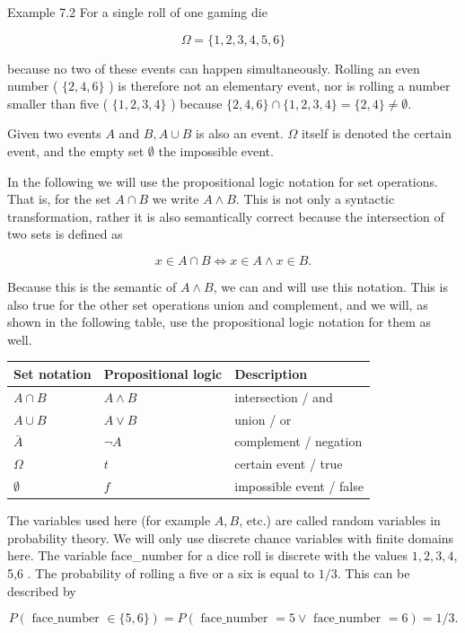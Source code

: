\documentclass[10pt]{article}
\begin{document}
Example 7.2 For a single roll of one gaming die

$$
\Omega=\{1,2,3,4,5,6\}
$$

because no two of these events can happen simultaneously. Rolling an even number ( $\{2,4,6\}$ ) is therefore not an elementary event, nor is rolling a number smaller than five ( $\{1,2,3,4\}$ ) because $\{2,4,6\} \cap\{1,2,3,4\}=\{2,4\} \neq \emptyset$.

Given two events $A$ and $B, A \cup B$ is also an event. $\Omega$ itself is denoted the certain event, and the empty set $\emptyset$ the impossible event.

In the following we will use the propositional logic notation for set operations. That is, for the set $A \cap B$ we write $A \wedge B$. This is not only a syntactic transformation, rather it is also semantically correct because the intersection of two sets is defined as

$$
x \in A \cap B \Leftrightarrow x \in A \wedge x \in B .
$$

Because this is the semantic of $A \wedge B$, we can and will use this notation. This is also true for the other set operations union and complement, and we will, as shown in the following table, use the propositional logic notation for them as well.

\begin{center}
\begin{tabular}{|l|l|l|}
\hline
Set notation & Propositional logic & Description \\
\hline
$A \cap B$ & $A \wedge B$ & intersection / and \\
\hline
$A \cup B$ & $A \vee B$ & union / or \\
\hline
$\bar{A}$ & $\neg A$ & complement / negation \\
\hline
$\Omega$ & $t$ & certain event / true \\
\hline
$\emptyset$ & $f$ & impossible event / false \\
\hline
\end{tabular}
\end{center}

The variables used here (for example $A, B$, etc.) are called random variables in probability theory. We will only use discrete chance variables with finite domains here. The variable face\_number for a dice roll is discrete with the values $1,2,3,4$, 5,6 . The probability of rolling a five or a six is equal to $1 / 3$. This can be described by

$$
P(\text { face_number } \in\{5,6\})=P(\text { face_number }=5 \vee \text { face_number }=6)=1 / 3 .
$$
\end{document}
